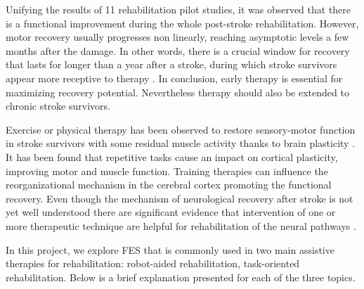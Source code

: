Unifying the results of 11 rehabilitation pilot studies, it was observed that there is a functional improvement during the whole post-stroke rehabilitation. However, motor recovery usually progresses non linearly, reaching asymptotic levels a few months after the damage. In other words, there is a crucial window for recovery that lasts for longer than a year after a stroke, during which stroke survivors appear more receptive to therapy \cite{Ballester2019}. In conclusion, early therapy is essential for maximizing recovery potential. Nevertheless therapy should also be extended to chronic stroke survivors.

Exercise or physical therapy has been observed to restore sensory-motor function in stroke survivors with some residual muscle activity thanks to brain plasticity \cite{Beekhuizen2005}. It has been found that repetitive tasks cause an impact on cortical plasticity, improving motor and muscle function. Training therapies can influence the reorganizational mechanism in the cerebral cortex promoting the functional recovery. Even though the mechanism of neurological recovery after stroke is not yet well understood there are significant evidence that intervention of one or more therapeutic technique are helpful for rehabilitation of the neural pathways \cite{Masiero2008}.

In this project, we explore FES that is commonly used in two main assistive therapies for rehabilitation: robot-aided rehabilitation, task-oriented rehabilitation. Below is a brief explanation presented for each of the three topics.

